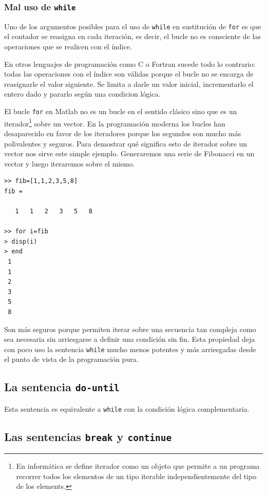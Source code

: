 \subsubsection{Mal uso de \texttt{while}}

Uno de los argumentos posibles para el uso de \texttt{while} en
sustitución de \texttt{for} es que el contador se reasigna en cada
iteración, es decir, el bucle no es consciente de las operaciones que
se realicen con el índice.

En otros lenguajes de programación como C o Fortran sucede todo lo
contrario: todas las operaciones con el índice son válidas porque el
bucle no se encarga de reasignarle el valor siguiente. Se limita a
darle un valor inicial, incrementarlo el entero dado y pararlo según
una condicion lógica.

El bucle \texttt{for} en Matlab no es un bucle en el sentido clásico
sino que es un iterador\footnote{En informática se define iterador
  como un objeto que permite a un programa recorrer todos los
  elementos de un tipo iterable independientemente del tipo de los
  elements.} sobre un vector. En la programación moderna los bucles
han desaparecido en favor de los iteradores porque los segundos son
mucho más polivalentes y seguros.  Para demostrar qué significa esto
de iterador sobre un vector nos sirve este simple ejemplo.
Generaremos una serie de Fibonacci en un vector y luego iteraremos
sobre el mismo.

\begin{lstlisting}
>> fib=[1,1,2,3,5,8]
fib =

   1   1   2   3   5   8

>> for i=fib
> disp(i)
> end
 1
 1
 2
 3
 5
 8
\end{lstlisting}

Son más seguros porque permiten iterar sobre una secuencia tan
compleja como sea necesaria sin arriesgarse a definir una condición
sin fin.  Esta propiedad deja con poco uso la sentencia
\texttt{while} mucho menos potentes y más arriesgadas desde el punto
de vista de la programación pura.

\subsection{La sentencia \texttt{do-until}}

Esta sentencia es equivalente a \texttt{while} con la condición lógica
complementaria.


\subsection{Las sentencias \texttt{break} y
  \texttt{continue}}

